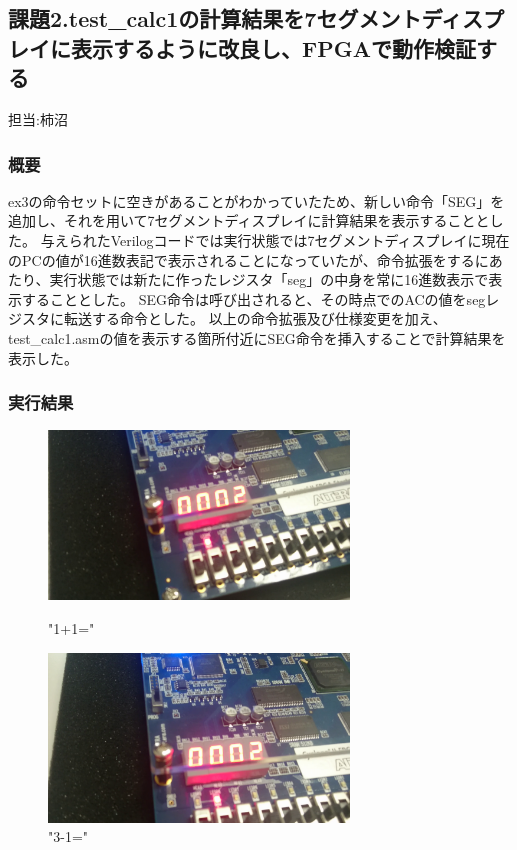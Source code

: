 \documentclass{jsarticle}
\begin{document}
\newpage


\subsection*{課題2.test\_calc1の計算結果を7セグメントディスプレイに表示するように改良し、FPGAで動作検証する}
担当:柿沼\\
\subsubsection*{概要}
ex3の命令セットに空きがあることがわかっていたため、新しい命令「SEG」を追加し、それを用いて7セグメントディスプレイに計算結果を表示することとした。
与えられたVerilogコードでは実行状態では7セグメントディスプレイに現在のPCの値が16進数表記で表示されることになっていたが、命令拡張をするにあたり、実行状態では新たに作ったレジスタ「seg」の中身を常に16進数表示で表示することとした。
SEG命令は呼び出されると、その時点でのACの値をsegレジスタに転送する命令とした。
以上の命令拡張及び仕様変更を加え、test\_calc1.asmの値を表示する箇所付近にSEG命令を挿入することで計算結果を表示した。

\subsubsection*{実行結果}

\begin{figure}[htbp]
 \begin{minipage}{0.5\hsize}
  \begin{center}
  \includegraphics[width=8cm,bb=0 0 1920 1080]{1+1.png}
  \end{center}
  \caption{"1+1="}
 \end{minipage}
 \begin{minipage}{0.5\hsize}
  \begin{center}
   \includegraphics[width=8cm,bb=0 0 1920 1080]{3-1.png}
  \end{center}
  \caption{"3-1="}
 \end{minipage}
\end{figure}
\end{document}
